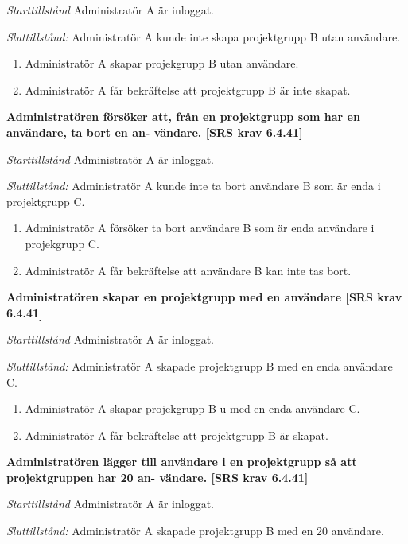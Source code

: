 \documentclass[a4paper]{article}
\begin{document}
\begin{FT}
\emph{Starttillstånd} Administratör A är inloggat.

\emph{Sluttillstånd:} Administratör A kunde inte skapa  projektgrupp B utan användare.

\begin{enumerate}
\item Administratör A skapar projekgrupp B utan användare.
\item Administratör A får bekräftelse att projektgrupp B är inte skapat.
\end{enumerate}

\item %
\textbf{Administratören försöker att, från en projektgrupp som har en användare, ta bort en an- vändare. [SRS krav 6.4.41]}

\emph{Starttillstånd} Administratör A är inloggat.

\emph{Sluttillstånd:} Administratör A kunde inte ta bort användare B som är enda i  projektgrupp C.

\begin{enumerate}
\item Administratör A försöker ta bort  användare B som är enda användare i projekgrupp C.
\item Administratör A får bekräftelse att användare B  kan inte tas bort.
\end{enumerate}

\item %
\textbf{Administratören skapar en projektgrupp med en användare [SRS krav 6.4.41]}

\emph{Starttillstånd} Administratör A är inloggat. 

\emph{Sluttillstånd:} Administratör A  skapade  projektgrupp B med en enda  användare C.

\begin{enumerate}
\item Administratör A skapar projekgrupp B u med en enda  användare C.
\item Administratör A får bekräftelse att projektgrupp B är skapat.
\end{enumerate}

\item %
\textbf{Administratören lägger till användare i en projektgrupp så att projektgruppen har 20 an- vändare. [SRS krav 6.4.41]}

\emph{Starttillstånd} Administratör A är inloggat.

\emph{Sluttillstånd:} Administratör A  skapade  projektgrupp B med en 20  användare.


\end{FT}
\end{document}
